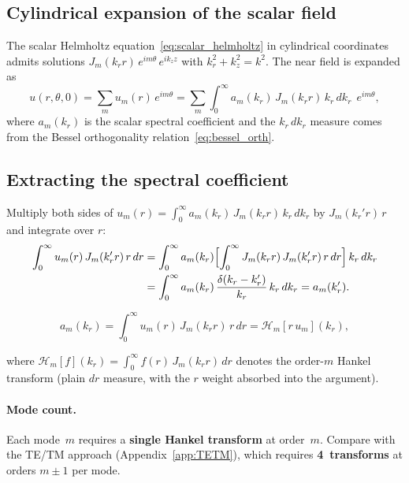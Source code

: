 \documentclass[11pt,a4paper]{article}
\newcommand{\HT}{\mathcal{H}}
\begin{document}
\subsection{Cylindrical expansion of the scalar field}

The scalar Helmholtz equation~\eqref{eq:scalar_helmholtz} in cylindrical coordinates
admits solutions $J_m(k_r r)\,e^{im\theta}\,e^{ik_z z}$ with $k_r^2 + k_z^2 = k^2$.
The near field is expanded as
\begin{equation}\label{eq:scalar_expansion}
  u(r,\theta,0) = \sum_m u_m(r)\,e^{im\theta}
  = \sum_m\int_0^\infty a_m(k_r)\,J_m(k_r r)\,k_r\,dk_r\;\,e^{im\theta},
\end{equation}
where $a_m(k_r)$ is the scalar spectral coefficient and the $k_r\,dk_r$ measure
comes from the Bessel orthogonality relation~\eqref{eq:bessel_orth}.

\subsection{Extracting the spectral coefficient}

Multiply both sides of $u_m(r) = \int_0^\infty a_m(k_r)\,J_m(k_r r)\,k_r\,dk_r$
by $J_m(k_r' r)\,r$ and integrate over $r$:
\begin{align}
  \int_0^\infty u_m(r)\,J_m(k_r' r)\,r\,dr
  &= \int_0^\infty a_m(k_r)\Bigl[\int_0^\infty J_m(k_r r)\,J_m(k_r' r)\,r\,dr\Bigr]\,k_r\,dk_r
  \nonumber\\
  &= \int_0^\infty a_m(k_r)\,\frac{\delta(k_r - k_r')}{k_r}\,k_r\,dk_r
  = a_m(k_r').
\end{align}

\begin{tcolorbox}[title=Scalar spectral coefficient]
\begin{equation}\label{eq:am_scalar}
  a_m(k_r)
  = \int_0^\infty u_m(r)\,J_m(k_r r)\,r\,dr
  = \HT_m[r\,u_m](k_r),
\end{equation}
\end{tcolorbox}

\noindent
where $\HT_m[f](k_r) = \int_0^\infty f(r)\,J_m(k_r r)\,dr$ denotes the order-$m$
Hankel transform (plain $dr$ measure, with the $r$ weight absorbed into the argument).

\paragraph{Mode count.}
Each mode~$m$ requires a \textbf{single Hankel transform} at order~$m$.
Compare with the TE/TM approach (Appendix~\ref{app:TETM}), which requires
\textbf{4~transforms} at orders $m\pm 1$ per mode.
\end{document}
